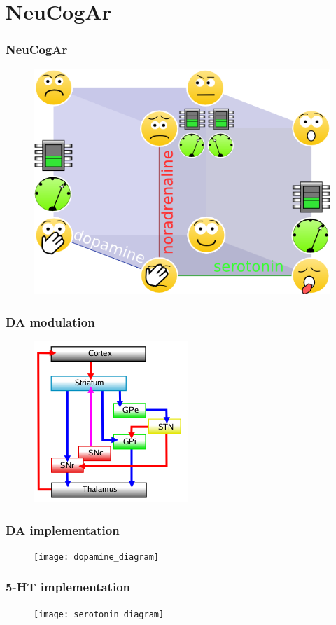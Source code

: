 \documentclass[12pt, aspectratio=169]{beamer}
\begin{document}
\section{NeuCogAr}
\begin{frame}
  \frametitle{NeuCogAr}
  \begin{figure}
    \includegraphics[width=0.5\linewidth]{cube_of_emotional_parameters_machine}
  \end{figure}
\end{frame}
\begin{frame}
\frametitle{DA modulation}
\begin{figure}
\includegraphics[width=0.5\linewidth]{nigrostriatal}
\end{figure}
\end{frame}
\begin{frame}
\frametitle{DA implementation}
\begin{figure}
\texttt{[image: dopamine\_diagram]}
\end{figure}
\end{frame}
\begin{frame}
\frametitle{5-HT implementation}
\begin{figure}
\texttt{[image: serotonin\_diagram]}
\end{figure}
\end{frame}
\end{document}
